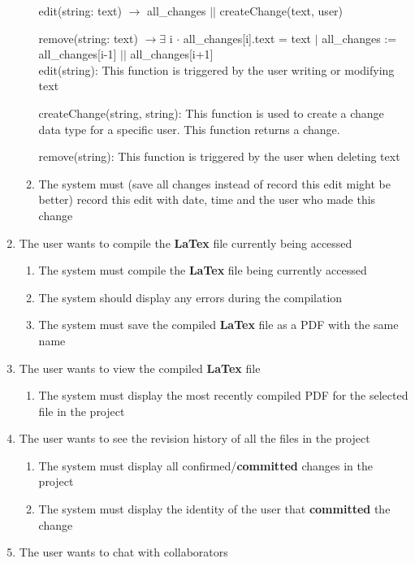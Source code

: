 \documentclass[12pt, titlepage]{article}
\begin{document}
\begin{enumerate}[{BE}1.]
\begin{enumerate}[resume*]
			edit(string: text) $\rightarrow$ all\_changes $\vert \vert$ createChange(text, user)
			
			remove(string: text) $\rightarrow \exists$ i $\cdot$ all\_changes[i].text = text $\vert$ all\_changes := all\_changes[i-1] $\vert \vert$ all\_changes[i+1]\\
			
			edit(string): This function is triggered by the user writing or modifying text
			
			createChange(string, string): This function is used to create a change data type for a specific user. This function returns a change.
			
			remove(string): This function is triggered by the user when deleting text\\
			
			\item The system must (save all changes instead of record this edit might be better) record this edit with date, time and the user who made this change
		\end{enumerate}
		\item The user wants to compile the \textbf{LaTex} file currently being accessed
		\begin{enumerate}[resume*]
			\item The system must compile the \textbf{LaTex} file being currently accessed
			\item The system should display any errors during the compilation
			\item The system must save the compiled \textbf{LaTex} file as a PDF with the same name
		\end{enumerate}
		\item The user wants to view the compiled \textbf{LaTex} file
		\begin{enumerate}[resume*]
			\item The system must display the most recently compiled PDF for the selected file in the project
		\end{enumerate}
		\item The user wants to see the revision history of all the files in the project
		\begin{enumerate}[resume*]
			\item The system must display all confirmed/\textbf{committed} changes in the project
			\item The system must display the identity of the user that \textbf{committed} the change
		\end{enumerate}
		\item The user wants to chat with collaborators

\end{enumerate}
\end{document}
